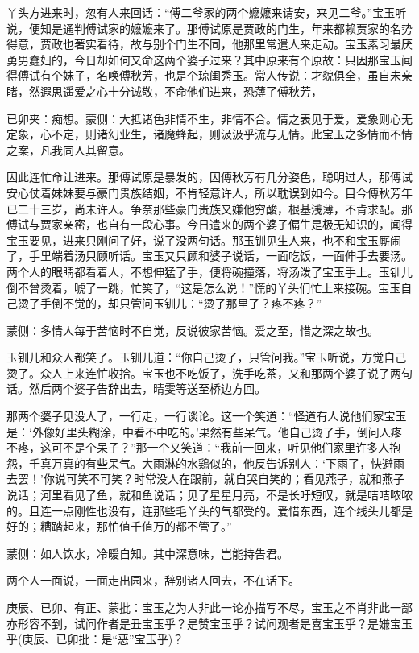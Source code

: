 \begin{parag}
    丫头方进来时，忽有人来回话：“傅二爷家的两个嬷嬷来请安，来见二爷。”宝玉听说，便知是通判傅试家的嬷嬷来了。那傅试原是贾政的门生，年来都赖贾家的名势得意，贾政也著实看待，故与别个门生不同，他那里常遣人来走动。宝玉素习最厌勇男蠢妇的，今日却如何又命这两个婆子过来？其中原来有个原故：只因那宝玉闻得傅试有个妹子，名唤傅秋芳，也是个琼闺秀玉。常人传说：才貌俱全，虽自未亲睹，然遐思遥爱之心十分诚敬，不命他们进来，恐薄了傅秋芳，\begin{note}已卯夹：痴想。蒙侧：大抵诸色非情不生，非情不合。情之表见于爱，爱象则心无定象，心不定，则诸幻业生，诸魔蜂起，则汲汲乎流与无情。此宝玉之多情而不情之案，凡我同人其留意。\end{note}因此连忙命让进来。那傅试原是暴发的，因傅秋芳有几分姿色，聪明过人，那傅试安心仗着妹妹要与豪门贵族结姻，不肯轻意许人，所以耽误到如今。目今傅秋芳年已二十三岁，尚未许人。争奈那些豪门贵族又嫌他穷酸，根基浅薄，不肯求配。那傅试与贾家亲密，也自有一段心事。今日遣来的两个婆子偏生是极无知识的，闻得宝玉要见，进来只刚问了好，说了没两句话。那玉钏见生人来，也不和宝玉厮闹了，手里端着汤只顾听话。宝玉又只顾和婆子说话，一面吃饭，一面伸手去要汤。两个人的眼睛都看着人，不想伸猛了手，便将碗撞落，将汤泼了宝玉手上。玉钏儿倒不曾烫着，唬了一跳，忙笑了，“这是怎么说！”慌的丫头们忙上来接碗。宝玉自己烫了手倒不觉的，却只管问玉钏儿：“烫了那里了？疼不疼？”\begin{note}蒙侧：多情人每于苦恼时不自觉，反说彼家苦恼。爱之至，惜之深之故也。\end{note}玉钏儿和众人都笑了。玉钏儿道：“你自己烫了，只管问我。”宝玉听说，方觉自己烫了。众人上来连忙收拾。宝玉也不吃饭了，洗手吃茶，又和那两个婆子说了两句话。然后两个婆子告辞出去，晴雯等送至桥边方回。
\end{parag}


\begin{parag}
    那两个婆子见没人了，一行走，一行谈论。这一个笑道：“怪道有人说他们家宝玉是：‘外像好里头糊涂，中看不中吃的。’果然有些呆气。他自己烫了手，倒问人疼不疼，这可不是个呆子？”那一个又笑道：“我前一回来，听见他们家里许多人抱怨，千真万真的有些呆气。大雨淋的水鶏似的，他反告诉别人：‘下雨了，快避雨去罢！’你说可笑不可笑？时常没人在跟前，就自哭自笑的；看见燕子，就和燕子说话；河里看见了鱼，就和鱼说话；见了星星月亮，不是长吁短叹，就是咭咭哝哝的。且连一点刚性也没有，连那些毛丫头的气都受的。爱惜东西，连个线头儿都是好的；糟踏起来，那怕值千值万的都不管了。”\begin{note}蒙侧：如人饮水，冷暖自知。其中深意味，岂能持告君。\end{note}两个人一面说，一面走出园来，辞别诸人回去，不在话下。\begin{note}庚辰、已卯、有正、蒙批：宝玉之为人非此一论亦描写不尽，宝玉之不肖非此一鄙亦形容不到，试问作者是丑宝玉乎？是赞宝玉乎？试问观者是喜宝玉乎？是嫌宝玉乎(庚辰、已卯批：是“恶”宝玉乎)？\end{note}
\end{parag}


